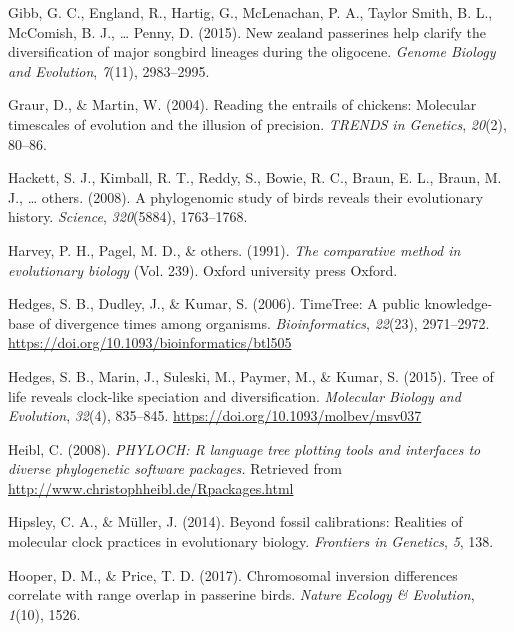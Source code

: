 \documentclass[english,man]{apa6}
\begin{document}
\leavevmode\hypertarget{ref-gibb2015new}{}%
Gibb, G. C., England, R., Hartig, G., McLenachan, P. A., Taylor Smith, B. L., McComish, B. J., \ldots{} Penny, D. (2015). New zealand passerines help clarify the diversification of major songbird lineages during the oligocene. \emph{Genome Biology and Evolution}, \emph{7}(11), 2983--2995.

\leavevmode\hypertarget{ref-graur2004reading}{}%
Graur, D., \& Martin, W. (2004). Reading the entrails of chickens: Molecular timescales of evolution and the illusion of precision. \emph{TRENDS in Genetics}, \emph{20}(2), 80--86.

\leavevmode\hypertarget{ref-hackett2008phylogenomic}{}%
Hackett, S. J., Kimball, R. T., Reddy, S., Bowie, R. C., Braun, E. L., Braun, M. J., \ldots{} others. (2008). A phylogenomic study of birds reveals their evolutionary history. \emph{Science}, \emph{320}(5884), 1763--1768.

\leavevmode\hypertarget{ref-harvey1991comparative}{}%
Harvey, P. H., Pagel, M. D., \& others. (1991). \emph{The comparative method in evolutionary biology} (Vol. 239). Oxford university press Oxford.

\leavevmode\hypertarget{ref-Hedges2006}{}%
Hedges, S. B., Dudley, J., \& Kumar, S. (2006). TimeTree: A public knowledge-base of divergence times among organisms. \emph{Bioinformatics}, \emph{22}(23), 2971--2972. \url{https://doi.org/10.1093/bioinformatics/btl505}

\leavevmode\hypertarget{ref-Hedges2015}{}%
Hedges, S. B., Marin, J., Suleski, M., Paymer, M., \& Kumar, S. (2015). Tree of life reveals clock-like speciation and diversification. \emph{Molecular Biology and Evolution}, \emph{32}(4), 835--845. \url{https://doi.org/10.1093/molbev/msv037}

\leavevmode\hypertarget{ref-Heibl2008}{}%
Heibl, C. (2008). \emph{PHYLOCH: R language tree plotting tools and interfaces to diverse phylogenetic software packages.} Retrieved from \url{http://www.christophheibl.de/Rpackages.html}

\leavevmode\hypertarget{ref-hipsley2014beyond}{}%
Hipsley, C. A., \& Müller, J. (2014). Beyond fossil calibrations: Realities of molecular clock practices in evolutionary biology. \emph{Frontiers in Genetics}, \emph{5}, 138.

\leavevmode\hypertarget{ref-hooper2017chromosomal}{}%
Hooper, D. M., \& Price, T. D. (2017). Chromosomal inversion differences correlate with range overlap in passerine birds. \emph{Nature Ecology \& Evolution}, \emph{1}(10), 1526.
\end{document}
